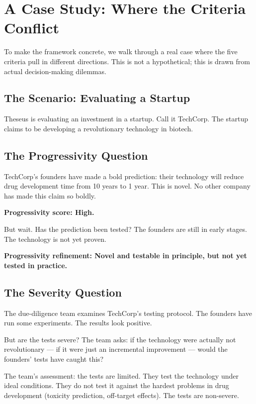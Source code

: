 \documentclass[11pt,letterpaper]{article}
\begin{document}
\section{A Case Study: Where the Criteria Conflict}

To make the framework concrete, we walk through a real case where the five criteria pull in different directions. This is not a hypothetical; this is drawn from actual decision-making dilemmas.

\subsection*{The Scenario: Evaluating a Startup}

Theseus is evaluating an investment in a startup. Call it TechCorp. The startup claims to be developing a revolutionary technology in biotech.

\subsection*{The Progressivity Question}

TechCorp's founders have made a bold prediction: their technology will reduce drug development time from 10 years to 1 year. This is novel. No other company has made this claim so boldly.

\textbf{Progressivity score: High.}

But wait. Has the prediction been tested? The founders are still in early stages. The technology is not yet proven.

\textbf{Progressivity refinement: Novel and testable in principle, but not yet tested in practice.}

\subsection*{The Severity Question}

The due-diligence team examines TechCorp's testing protocol. The founders have run some experiments. The results look positive.

But are the tests severe? The team asks: if the technology were actually not revolutionary — if it were just an incremental improvement — would the founders' tests have caught this?

The team's assessment: the tests are limited. They test the technology under ideal conditions. They do not test it against the hardest problems in drug development (toxicity prediction, off-target effects). The tests are non-severe.
\end{document}

